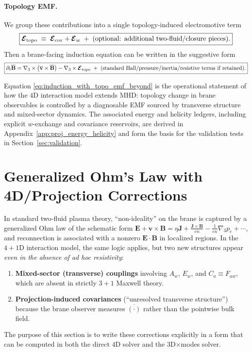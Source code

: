 \documentclass[11pt]{article}
\newcommand{\gradthree}{\nabla_3}
\begin{document}
\paragraph{Topology EMF.}
We group these contributions into a single topology-induced electromotive term
\begin{equation}
\boxed{
\boldsymbol{\mathcal{E}}_{\rm topo}
\;\equiv\;
\boldsymbol{\mathcal{E}}_{\rm cov} + \boldsymbol{\mathcal{E}}_{w}
\;+\;(\text{optional: additional two-fluid/closure pieces}).
}
\label{eq:Etopo_def_beyond}
\end{equation}
Then a brane-facing induction equation can be written in the suggestive form
\begin{equation}
\boxed{
\partial_t \overline{\mathbf{B}}
=
\nabla_3\times\big(\overline{\mathbf{v}}\times\overline{\mathbf{B}}\big)
-\nabla_3\times \boldsymbol{\mathcal{E}}_{\rm topo}
\;+\;\text{(standard Hall/pressure/inertia/resistive terms if retained)}.
}
\label{eq:induction_with_topo_emf_beyond}
\end{equation}

Equation \eqref{eq:induction_with_topo_emf_beyond} is the operational statement of how the
\(4\)D interaction model extends MHD: topology change in brane observables is controlled by a
diagnosable EMF sourced by transverse structure and mixed-sector dynamics. The associated
energy and helicity ledgers, including explicit \(w\)-exchange and covariance reservoirs,
are derived in Appendix~\ref{app:proj_energy_helicity} and form the basis for the validation
tests in Section~\ref{sec:validation}.

\section{Generalized Ohm's Law with 4D/Projection Corrections}
\label{sec:generalized_ohm_4d}

In standard two-fluid plasma theory, ``non-ideality'' on the brane is captured by a
generalized Ohm law of the schematic form
\(
\mathbf{E}+\mathbf{v}\times\mathbf{B}
=\eta\mathbf{J} + \frac{\mathbf{J}\times\mathbf{B}}{en} - \frac{1}{en}\gradthree p_e + \cdots
\),
and reconnection is associated with a nonzero
\(\mathbf{E}\cdot\mathbf{B}\) in localized regions.
In the \(4+1\)D interaction model, the same logic applies, but two new structures appear
\emph{even in the absence of ad hoc resistivity}:
\begin{enumerate}[leftmargin=1.6em]
\item \textbf{Mixed-sector (transverse) couplings} involving \(A_w\), \(E_w\), and
\(C_a\equiv F_{aw}\), which are absent in strictly \(3+1\) Maxwell theory.
\item \textbf{Projection-induced covariances} (``unresolved transverse structure'') because
the brane observer measures \(\overline{(\cdot)}\) rather than the pointwise bulk field.
\end{enumerate}
The purpose of this section is to write these corrections explicitly in a form that can be
computed in both the direct \(4\)D solver and the 3D\(\times\)modes solver.
\end{document}

